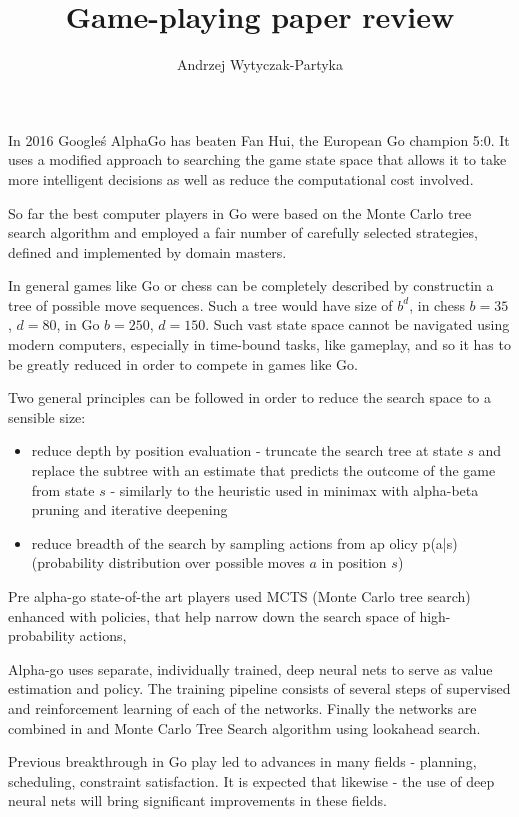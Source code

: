 \documentclass[a4paper]{article}
\author{Andrzej Wytyczak-Partyka}
\title{Game-playing paper review}
\begin{document}
\maketitle
In 2016 Google\'s AlphaGo has beaten Fan Hui, the European Go champion 5:0.
It uses a modified approach to searching the game state space that allows it to
take more intelligent decisions as well as reduce the computational cost involved.

So far the best computer players in Go were based on the Monte Carlo tree search algorithm
and employed a fair number of carefully selected strategies, defined and implemented
by domain masters.

In general games like Go or chess can be completely described by constructin a tree
of possible move sequences. Such a tree would have size of $b^d$, in chess
$b=35$, $d=80$, in Go $b=250$, $d=150$. Such vast state space cannot be navigated
using modern computers, especially in time-bound tasks, like gameplay, and so it
has to be greatly reduced in order to compete in games like Go.

Two general principles can be followed in order to reduce the search space to a sensible size:
\begin{itemize}
  \item{reduce depth by position evaluation - truncate the search tree at state $s$ and replace the subtree with an estimate that predicts the outcome of the game from state $s$ - similarly to the heuristic used in minimax with alpha-beta pruning and iterative deepening}
  \item{reduce breadth of the search by sampling actions from ap olicy p(a|s) (probability distribution over possible moves $a$ in position $s$)}
\end{itemize}

Pre alpha-go state-of-the art players used MCTS (Monte Carlo tree search) enhanced
with policies, that help narrow down the search space of high-probability actions,

Alpha-go uses separate, individually trained, deep neural nets to serve as value
estimation and policy. The training pipeline consists of several steps of supervised
and reinforcement learning of each of the networks. Finally the networks are combined
in and Monte Carlo Tree Search algorithm using lookahead search.



Previous breakthrough in Go play led to advances in many fields - planning, scheduling, constraint satisfaction. It is expected that likewise - the use of deep neural nets will bring significant improvements in these fields.
\end{document}
